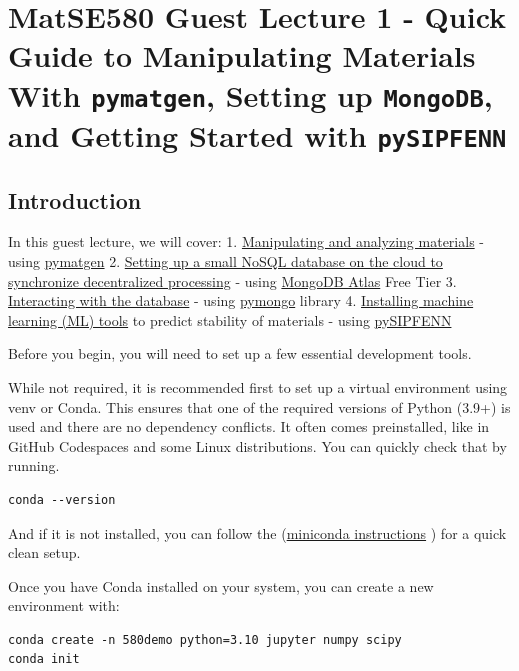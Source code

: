 \chapter{MatSE580 Guest Lecture 1 - Quick Guide to Manipulating Materials With \texttt{pymatgen}, Setting up \texttt{MongoDB}, and Getting Started with \texttt{pySIPFENN}} 
\label{chap:pysipfenntutorial1} 

\hypertarget{introduction}{%
\section{Introduction}\label{pysipfenntutorial:introduction}}

In this guest lecture, we will cover: 1.
\protect\hyperlink{Manipulating-and-analyzing-materials}{Manipulating
and analyzing materials} - using
\href{https://github.com/materialsproject/pymatgen}{pymatgen} 2.
\protect\hyperlink{Setting-up-MongoDB}{Setting up a small NoSQL database
on the cloud to synchronize decentralized processing} - using
\href{https://www.mongodb.com/atlas}{MongoDB Atlas} Free Tier 3.
\protect\hyperlink{pymongo}{Interacting with the database} - using
\href{https://github.com/mongodb/mongo-python-driver}{pymongo} library
4. \protect\hyperlink{pysipfenn-install}{Installing machine learning
(ML) tools} to predict stability of materials - using
\href{https://pysipfenn.readthedocs.io/en/stable/}{pySIPFENN}

Before you begin, you will need to set up a few essential development
tools.

While not required, it is recommended first to set up a virtual
environment using venv or Conda. This ensures that one of the required
versions of Python (3.9+) is used and there are no dependency conflicts.
It often comes preinstalled, like in GitHub Codespaces and some Linux
distributions. You can quickly check that by running.

\begin{verbatim}
conda --version
\end{verbatim}

And if it is not installed, you can follow the
(\href{https://docs.conda.io/en/latest/miniconda.html}{miniconda
instructions} ) for a quick clean setup.

Once you have Conda installed on your system, you can create a new
environment with:

\begin{verbatim}
conda create -n 580demo python=3.10 jupyter numpy scipy
conda init
\end{verbatim}

